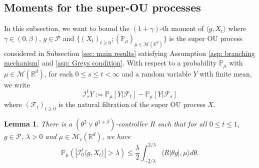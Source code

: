\documentclass[12pt,a4paper]{amsart}
\theoremstyle{plain}
\newtheorem{lem}[thm]{Lemma}
\theoremstyle{definition}
\numberwithin{equation}{section}
\begin{document}
\subsection{Moments for the super-OU processes}

    In this subsection,  we want to bound the $(1+\gamma)$-th moment of $\langle g ,X_t \rangle$ where $\gamma \in (0,\beta)$, $g\in \mathcal P$ and $\{(X_t)_{t\geq 0}; (\mathbb P_\mu)_{\mu \in \mathcal M(\mathbb R^d)}\}$ is the super OU process considered in Subsection \ref{sec: main results} satisfying Assumption \ref{asp: branching mechanism} and \ref{asp: Greys condition}.
    With respect to a probability $\mathbb P_\mu$ with $\mu\in \mathcal M(\mathbb R^d)$, for each $0 \leq s \leq t <\infty$ and a random variable $Y$ with finite mean, we write
\begin{equation}\label{Ist}
    \mathcal I_s^t Y
    := \mathbb P_\mu[Y|\mathscr F_t] - \mathbb P_\mu[Y|\mathscr F_s]
\end{equation}
    where $(\mathscr F_t)_{t\geq 0}$ is the natural filtration of the super OU process $X$.

\begin{lem}
\label{lem: control pair for P(M>lambda)}
    There is a $(\theta^2\vee\theta^{1+\beta})$-controller $R$ such that for all $0\leq t\leq 1$, $g\in \mathcal P$, $\lambda >0$ and $\mu\in \mathcal M_c(\mathbb R^d)$, we have
\[
    \mathbb P_\mu ( |\mathcal{I}_0^t\langle g,X_t\rangle| > \lambda)
    \leq \frac{\lambda}{2}\int_{-2/\lambda}^{2/\lambda}\langle R|\theta g|,\mu\rangle d\theta.
\]
\end{lem}
\end{document}
